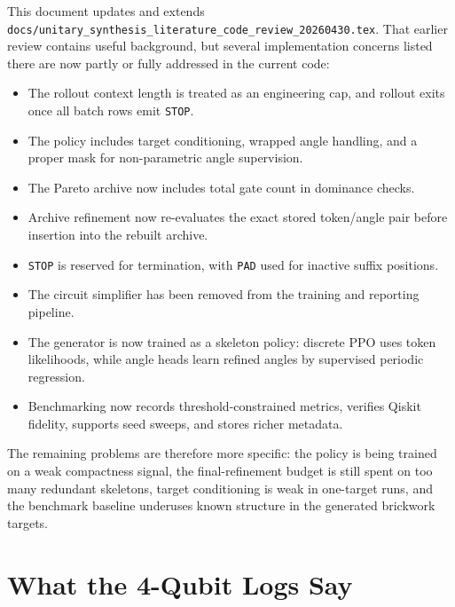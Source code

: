 \documentclass[11pt]{article}
\begin{document}
This document updates and extends
\texttt{docs/unitary\_synthesis\_literature\_code\_review\_20260430.tex}.  That
earlier review contains useful background, but several implementation concerns
listed there are now partly or fully addressed in the current code:
\begin{itemize}
  \item The rollout context length is treated as an engineering cap, and
  rollout exits once all batch rows emit \texttt{STOP}.
  \item The policy includes target conditioning, wrapped angle handling, and a
  proper mask for non-parametric angle supervision.
  \item The Pareto archive now includes total gate count in dominance checks.
  \item Archive refinement now re-evaluates the exact stored token/angle pair
  before insertion into the rebuilt archive.
  \item \texttt{STOP} is reserved for termination, with \texttt{PAD} used for
  inactive suffix positions.
  \item The circuit simplifier has been removed from the training and
  reporting pipeline.
  \item The generator is now trained as a skeleton policy: discrete PPO uses
  token likelihoods, while angle heads learn refined angles by supervised
  periodic regression.
  \item Benchmarking now records threshold-constrained metrics, verifies Qiskit
  fidelity, supports seed sweeps, and stores richer metadata.
\end{itemize}

The remaining problems are therefore more specific: the policy is being trained
on a weak compactness signal, the final-refinement budget is still spent on too
many redundant skeletons, target conditioning is weak in one-target runs, and
the benchmark baseline underuses known structure in the generated brickwork
targets.

\section{What the 4-Qubit Logs Say}
\end{document}
